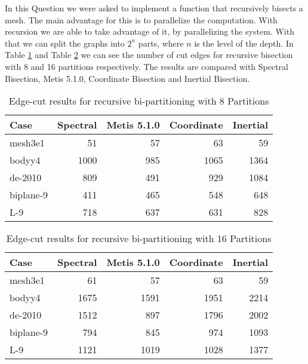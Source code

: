 \documentclass[unicode,11pt,a4paper,oneside,numbers=endperiod,openany]{scrartcl}
\begin{document}
In this Question we were asked to implement a function that recursively bisects a mesh. The main advantage for this is to parallelize the computation. With recursion we are able to take advantage of it, by parallelizing the system. With that we can split the graphs into $2^n$ parts, where $n$ is the level of the depth. In Table \ref{table:Rec_bisection-8} and Table \ref{table:Rec_bisection-16} we can see the number of cut edges for recursive bisection with 8 and 16 partitions respectively. The results are compared with Spectral Bisection, Metis 5.1.0, Coordinate Bisection and Inertial Bisection.
\begin{table}[h]
    \caption{Edge-cut results for recursive bi-partitioning with 8 Partitions}
    \centering
    \begin{tabular}{l|r|r|r|r} \hline\hline
        Case      & Spectral & Metis 5.1.0 & Coordinate & Inertial \\ \hline
        mesh3e1   & 51       & 57          & 63         & 59       \\
        bodyy4    & 1000     & 985         & 1065       & 1364     \\
        de-2010   & 809      & 491         & 929        & 1084     \\
        biplane-9 & 411      & 465         & 548        & 648      \\
        L-9       & 718      & 637         & 631        & 828      \\  \hline \hline
    \end{tabular}
    \label{table:Rec_bisection-8}
\end{table}

\begin{table}[h]
    \caption{Edge-cut results for recursive bi-partitioning with 16 Partitions}
    \centering
    \begin{tabular}{l|r|r|r|r} \hline\hline
        Case      & Spectral & Metis 5.1.0 & Coordinate & Inertial \\ \hline
        mesh3e1   & 61       & 57          & 63         & 59       \\
        bodyy4    & 1675     & 1591        & 1951       & 2214     \\
        de-2010   & 1512     & 897         & 1796       & 2002     \\
        biplane-9 & 794      & 845         & 974        & 1093     \\
        L-9       & 1121     & 1019        & 1028       & 1377     \\  \hline \hline
    \end{tabular}
    \label{table:Rec_bisection-16}
\end{table}
\end{document}
